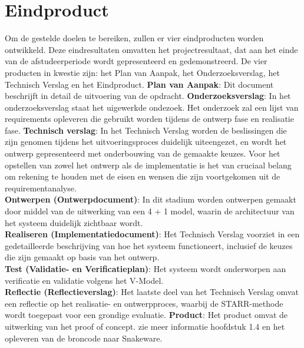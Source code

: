 \section{Eindproduct}
Om de gestelde doelen te bereiken, zullen er vier eindproducten worden ontwikkeld.
Deze eindresultaten omvatten het projectresultaat, dat aan het einde van de afstudeerperiode wordt gepresenteerd en gedemonstreerd.
De vier producten in kwestie zijn: het Plan van Aanpak, het Onderzoeksverslag, het Technisch Verslag en het Eindproduct.
\whitespace
\textbf{Plan van Aanpak}: Dit document beschrijft in detail de uitvoering van de opdracht.
\whitespace
\textbf{Onderzoeksverslag}: In het onderzoeksverslag staat het uigewerkde ondezoek.
Het onderzoek zal een lijst van requirements opleveren die gebruikt worden tijdens de ontwerp fase en realisatie fase.
\whitespace
\textbf{Technisch verslag}: In het Technisch Verslag worden de beslissingen die zijn genomen tijdens het uitvoeringsproces duidelijk uiteengezet, en wordt het ontwerp gepresenteerd met onderbouwing van de gemaakte keuzes.
Voor het opstellen van zowel het ontwerp als de implementatie is het van cruciaal belang om rekening te houden met de eisen en wensen die zijn voortgekomen uit de requirementanalyse. \\
\textbf{Ontwerpen (Ontwerpdocument)}: In dit stadium worden ontwerpen gemaakt door middel van de uitwerking van een 4 + 1 model, waarin de architectuur van het systeem duidelijk zichtbaar wordt.\\
\textbf{Realiseren (Implementatiedocument)}: Het Technisch Verslag voorziet in een gedetailleerde beschrijving van hoe het systeem functioneert, inclusief de keuzes die zijn gemaakt op basis van het ontwerp. \\
\textbf{Test (Validatie- en Verificatieplan)}: Het systeem wordt onderworpen aan verificatie en validatie volgens het V-Model.                                                                                             \\
\textbf{Reflectie (Reflectieverslag)}: Het laatste deel van het Technisch Verslag omvat een reflectie op het realisatie- en ontwerpproces, waarbij de STARR-methode \Parencite{STARR} wordt toegepast voor een grondige evaluatie.
\whitespace
\textbf{Product}: Het product omvat de uitwerking van het proof of concept. zie meer informatie hoofdstuk 1.4 en het opleveren van de broncode naar Snakeware.
